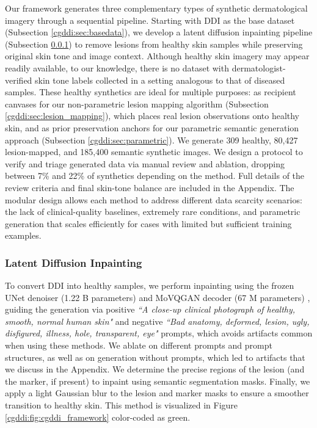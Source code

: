 \documentclass[11pt]{ucthesis}
\begin{document}
\label{cgddi:sec:method}
Our framework generates three complementary types of synthetic dermatological imagery through a sequential pipeline. Starting with DDI as the base dataset (Subsection \ref{cgddi:sec:basedata}), we develop a latent diffusion inpainting pipeline (Subsection \ref{cgddi:sec:in-painting}) to remove lesions from healthy skin samples while preserving original skin tone and image context. Although healthy skin imagery may appear readily available, to our knowledge, there is no dataset with dermatologist-verified skin tone labels collected in a setting analogous to that of diseased samples. These healthy synthetics are ideal for multiple purposes: as recipient canvases for our non-parametric lesion mapping algorithm (Subsection \ref{cgddi:sec:lesion_mapping}), which places real lesion observations onto healthy skin, and as prior preservation anchors for our parametric semantic generation approach (Subsection \ref{cgddi:sec:parametric}). We generate 309 healthy, 80,427 lesion-mapped, and 185,400 semantic synthetic images. We design a protocol to verify and triage generated data via manual review and ablation, dropping between 7\% and 22\% of synthetics depending on the method. Full details of the review criteria and final skin-tone balance are included in the Appendix. The modular design allows each method to address different data scarcity scenarios: the lack of clinical-quality baselines, extremely rare conditions, and parametric generation that scales efficiently for cases with limited but sufficient training examples.


\subsubsection{Latent Diffusion Inpainting}
\label{cgddi:sec:in-painting}

To convert DDI into healthy samples, we perform inpainting using the frozen UNet denoiser (1.22 B parameters) and MoVQGAN decoder (67 M parameters) \cite{razzhigaev-2023}, guiding the generation via positive \textit{``A close-up clinical photograph of healthy, smooth, normal human skin"} and negative \textit{``Bad anatomy, deformed, lesion, ugly, disfigured, illness, hole, transparent, eye"} prompts, which avoids artifacts common when using these methods. We ablate on different prompts and prompt structures, as well as on generation without prompts, which led to artifacts that we discuss in the Appendix. We determine the precise regions of the lesion (and the marker, if present) to inpaint using semantic segmentation masks. Finally, we apply a light Gaussian blur to the lesion and marker masks to ensure a smoother transition to healthy skin. This method is visualized in Figure \ref{cgddi:fig:cgddi_framework} color-coded as green.
\end{document}
